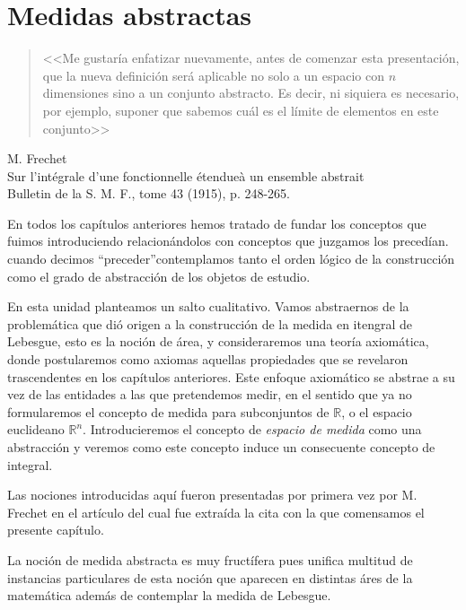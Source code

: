 \chapter{Medidas abstractas}

\begin{quote}
 <<Me gustaría enfatizar nuevamente, antes de comenzar esta presentación, que la nueva definición será aplicable no solo a un espacio con $n$ dimensiones sino a un conjunto abstracto. Es decir, ni siquiera es necesario, por ejemplo, suponer que sabemos cuál es el límite de elementos en este conjunto>> 
\end{quote}
\begin{flushright}
 M. Frechet \\
Sur l’intégrale d’une fonctionnelle étendueà un ensemble abstrait\\
Bulletin de la S. M. F., tome  43 (1915), p. 248-265.
\end{flushright}

En todos los capítulos anteriores hemos tratado de fundar los conceptos que fuimos introduciendo relacionándolos con  conceptos que juzgamos los precedían. cuando decimos  ``preceder''contemplamos tanto el orden lógico de la construcción  como  el grado de abstracción de los objetos de estudio.

En esta unidad planteamos un salto cualitativo. Vamos abstraernos de la problemática que dió origen a la construcción de la medida en itengral de Lebesgue, esto es la noción de área, y consideraremos una teoría axiomática, donde postularemos como axiomas aquellas propiedades que se revelaron trascendentes en los capítulos anteriores. Este enfoque axiomático se abstrae a su vez de las entidades a las que pretendemos medir, en el sentido que ya no formularemos el concepto de medida para subconjuntos de $\mathbb{R}$, o el espacio euclideano $\mathbb{R}^n$. Introducieremos el concepto de \emph{espacio de medida}  como una abstracción y veremos como este concepto induce un consecuente concepto de integral.  


Las nociones introducidas aquí fueron presentadas por primera vez por M. Frechet en el artículo del cual fue extraída la cita con la que comensamos el presente capítulo. 

La noción de medida abstracta es muy fructífera pues unifica multitud de instancias particulares de esta noción que aparecen en distintas áres de la matemática  además de contemplar la medida de Lebesgue. 

